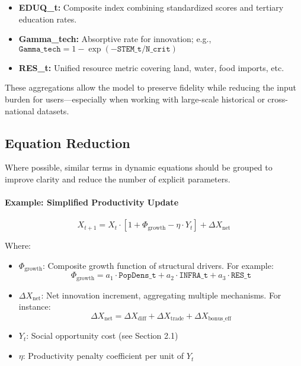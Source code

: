 \documentclass[12pt]{report}
\begin{document}
\begin{itemize}
  \item \textbf{EDUQ\_t:} Composite index combining standardized scores and tertiary education rates.
  \item \textbf{Gamma\_tech:} Absorptive rate for innovation; e.g., $\texttt{Gamma\_tech} = 1 - \exp(-\texttt{STEM\_t} / \texttt{N\_crit})$
  \item \textbf{RES\_t:} Unified resource metric covering land, water, food imports, etc.
\end{itemize}

\noindent These aggregations allow the model to preserve fidelity while reducing the input burden for users—especially when working with large-scale historical or cross-national datasets.

\subsection{Equation Reduction}

Where possible, similar terms in dynamic equations should be grouped to improve clarity and reduce the number of explicit parameters.

\paragraph{Example: Simplified Productivity Update}
\begin{equation}
X_{t+1} = X_t \cdot \left[1 + \Phi_{\text{growth}} - \eta \cdot Y_t \right] + \Delta X_{\text{net}}
\end{equation}

\noindent Where:
\begin{itemize}
  \item $\Phi_{\text{growth}}$: Composite growth function of structural drivers. For example:
  \begin{equation}
  \Phi_{\text{growth}} = a_1 \cdot \texttt{PopDens\_t} + a_2 \cdot \texttt{INFRA\_t} + a_3 \cdot \texttt{RES\_t}
  \end{equation}
  
  \item $\Delta X_{\text{net}}$: Net innovation increment, aggregating multiple mechanisms. For instance:
  \begin{equation}
  \Delta X_{\text{net}} = \Delta X_{\text{diff}} + \Delta X_{\text{trade}} + \Delta X_{\text{bonus\_eff}}
  \end{equation}
  
  \item $Y_t$: Social opportunity cost (see Section 2.1)
  \item $\eta$: Productivity penalty coefficient per unit of $Y_t$
\end{itemize}
\end{document}
